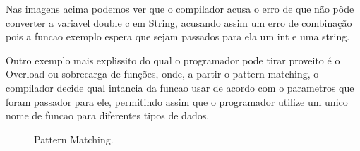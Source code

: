 \documentclass[rel_mlp]{iiufrgs}
\newcommand{\fonte}[1]{\\Fonte: {#1}}
\begin{document}
	Nas imagens acima podemos ver que o compilador acusa o erro de que não pôde converter a variavel double c em String, acusando assim um erro de combinação pois a funcao exemplo espera que sejam passados para ela um int e uma string.

	Outro exemplo mais explissito do qual o programador pode tirar proveito é o Overload ou sobrecarga de funções, onde, a partir o pattern matching, o compilador decide qual intancia da funcao usar de acordo com o parametros que foram passador para ele, permitindo assim que o programador utilize um unico nome de funcao para diferentes tipos de dados.
	
	\begin{figure}[htb]
    \centering
    \label{fig:figura1}
    \caption{Pattern Matching.}
\end{figure}


%

%

\end{document}
